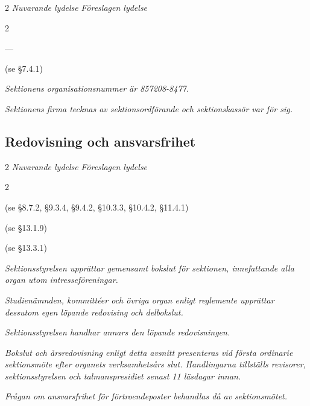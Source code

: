 \documentclass{article}
\newenvironment{lydelse}
    {\begin{paracol}{2}%
        \emph{Nuvarande lydelse}%
        \switchcolumn%
        \emph{Föreslagen lydelse}%
    \end{paracol}%
    \begin{enumerate}[label=\thesubsection.\arabic*]%
    \begin{paracol}{2}%
    }{\end{paracol}\end{enumerate}}
\begin{document}
\begin{lydelse}
  \item[] ---

  \item[] (se \S 7.4.1)
  
  \switchcolumn

  \item \emph{Sektionens organisationsnummer är 857208-8477.}

  \item \emph{Sektionens firma tecknas av sektionsordförande och sektionskassör var för sig.}
\end{lydelse}

\subsection{Redovisning och ansvarsfrihet} \label{14.x:redovisning}
\begin{lydelse}
  \item[] (se \S 8.7.2, \S 9.3.4, \S 9.4.2, \S 10.3.3, \S 10.4.2, \S 11.4.1)
  \item[] (se \S 13.1.9)
  \item[] (se \S 13.3.1)
  \switchcolumn
  \setcounter{enumi}{0}  
  \item \emph{Sektionsstyrelsen upprättar gemensamt bokslut för sektionen, innefattande alla organ utom intresseföreningar.}
  \item \emph{Studienämnden, kommittéer och övriga organ enligt reglemente upprättar dessutom egen löpande redovising och delbokslut.}
  \item \emph{Sektionsstyrelsen handhar annars den löpande redovisningen.}
  \item \emph{Bokslut och årsredovisning enligt detta avsnitt presenteras vid första ordinarie sektionsmöte efter organets verksamhetsårs slut.
      Handlingarna tillställs revisorer, sektionsstyrelsen och talmanspresidiet senast 11 läsdagar innan.} \label{14.x:tillställa}
  \item \emph{Frågan om ansvarsfrihet för förtroendeposter behandlas då av sektionsmötet.}
\end{lydelse}
\end{document}
